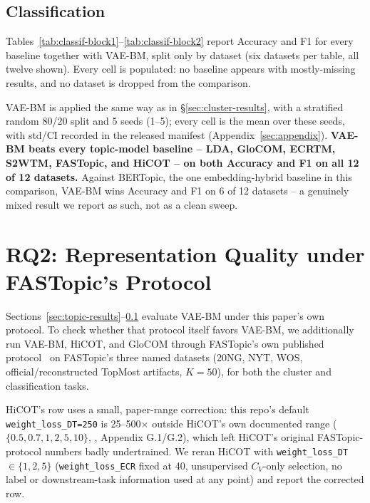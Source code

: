 \documentclass[11pt]{article}
\begin{document}
\subsection{Classification}
\label{sec:classification-results}



Tables~\ref{tab:classif-block1}--\ref{tab:classif-block2} report Accuracy and F1 for every baseline together with VAE-BM, split only by dataset (six datasets per table, all twelve shown). Every cell is populated: no baseline appears with mostly-missing results, and no dataset is dropped from the comparison.

VAE-BM is applied the same way as in \S\ref{sec:cluster-results}, with a stratified random 80/20 split and 5 seeds (1--5); every cell is the mean over these seeds, with std/CI recorded in the released manifest (Appendix~\ref{sec:appendix}). \textbf{VAE-BM beats every topic-model baseline -- LDA, GloCOM, ECRTM, S2WTM, FASTopic, and HiCOT -- on both Accuracy and F1 on all 12 of 12 datasets.} Against BERTopic, the one embedding-hybrid baseline in this comparison, VAE-BM wins Accuracy and F1 on 6 of 12 datasets -- a genuinely mixed result we report as such, not as a clean sweep.

\section{RQ2: Representation Quality under FASTopic's Protocol}
\label{sec:rq2}

Sections~\ref{sec:topic-results}--\ref{sec:classification-results} evaluate VAE-BM under this paper's own protocol. To check whether that protocol itself favors VAE-BM, we additionally run VAE-BM, HiCOT, and GloCOM through FASTopic's own published protocol~\citep{wu2024fastopic} on FASTopic's three named datasets (20NG, NYT, WOS, official/reconstructed TopMost artifacts, $K{=}50$), for both the cluster and classification tasks.



HiCOT's row uses a small, paper-range correction: this repo's default \texttt{weight\_loss\_DT=250} is 25--500$\times$ outside HiCOT's own documented range ($\{0.5,0.7,1,2,5,10\}$, \citealp{hicot2025}, Appendix G.1/G.2), which left HiCOT's original FASTopic-protocol numbers badly undertrained. We reran HiCOT with \texttt{weight\_loss\_DT}$\in\{1,2,5\}$ (\texttt{weight\_loss\_ECR} fixed at 40, unsupervised $C_V$-only selection, no label or downstream-task information used at any point) and report the corrected row.
\end{document}
